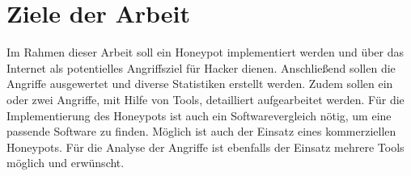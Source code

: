 \section{Ziele der Arbeit}
Im Rahmen dieser Arbeit soll ein Honeypot implementiert werden und über das Internet als potentielles Angriffsziel für Hacker dienen. Anschließend sollen die Angriffe ausgewertet und diverse Statistiken erstellt werden. Zudem sollen ein oder zwei Angriffe, mit Hilfe von Tools, detailliert aufgearbeitet werden. Für die Implementierung des Honeypots ist auch ein Softwarevergleich nötig, um eine passende Software zu finden. Möglich ist auch der Einsatz eines kommerziellen Honeypots.
Für die Analyse der Angriffe ist ebenfalls der Einsatz mehrere Tools möglich und erwünscht. 